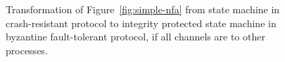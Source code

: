\documentclass{article}
\begin{document}
	\FloatBarrier
	\begin{figure}[ht!]
		\center
		\caption{Transformation of Figure~\ref{fig:simple-nfa} from state machine in crash-resistant protocol to integrity protected state machine in byzantine fault-tolerant protocol, if all channels are to other processes.}
		\label{fig:nfa-transformation}
	\end{figure}
	\FloatBarrier
\end{document}
